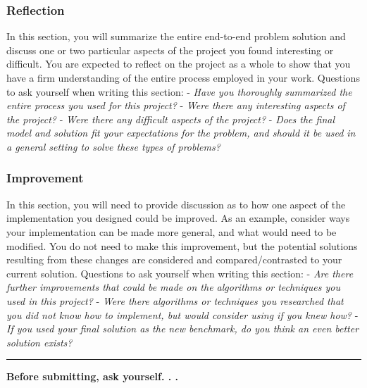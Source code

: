 \documentclass[]{report}
\begin{document}
\subsubsection{Reflection}\label{reflection}

In this section, you will summarize the entire end-to-end problem
solution and discuss one or two particular aspects of the project you
found interesting or difficult. You are expected to reflect on the
project as a whole to show that you have a firm understanding of the
entire process employed in your work. Questions to ask yourself when
writing this section: - \emph{Have you thoroughly summarized the entire
process you used for this project?} - \emph{Were there any interesting
aspects of the project?} - \emph{Were there any difficult aspects of the
project?} - \emph{Does the final model and solution fit your
expectations for the problem, and should it be used in a general setting
to solve these types of problems?}

\subsubsection{Improvement}\label{improvement}

In this section, you will need to provide discussion as to how one
aspect of the implementation you designed could be improved. As an
example, consider ways your implementation can be made more general, and
what would need to be modified. You do not need to make this
improvement, but the potential solutions resulting from these changes
are considered and compared/contrasted to your current solution.
Questions to ask yourself when writing this section: - \emph{Are there
further improvements that could be made on the algorithms or techniques
you used in this project?} - \emph{Were there algorithms or techniques
you researched that you did not know how to implement, but would
consider using if you knew how?} - \emph{If you used your final solution
as the new benchmark, do you think an even better solution exists?}

\begin{center}\rule{3in}{0.4pt}\end{center}

\textbf{Before submitting, ask yourself. . .}
\end{document}
